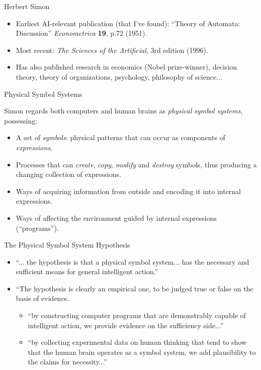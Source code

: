 \documentclass{article}
\begin{document}
\begin{slide}{}
{\Large Herbert Simon}
\begin{itemize}
\item Earliest AI-relevant publication (that I've
found): ``Theory of Automata: Discussion'' {\em Econometrica} {\bf
19}, p.72 (1951).
\item Most recent: {\em The Sciences of the Artificial}, 3rd edition
(1996).
\item Has also published research in economics (Nobel prize-winner),
decision theory, theory of organizations, psychology, philosophy of
science...
\end{itemize}
\end{slide}

\begin{slide}{}
{\Large Physical Symbol Systems}

Simon regards both computers and human brains as {\em physical symbol
systems}, possessing:
\begin{itemize}
\item A set of {\em symbols}: physical patterns that can occur as
components of {\em expressions}.
\item Processes that can {\em create}, {\em copy}, {\em modify} and
{\em destroy} symbols, thus producing a changing collection of
expressions.
\item Ways of acquiring information from outside and encoding
it into internal expressions.
\item Ways of affecting the environment guided by
internal expressions (``programs'').
\end{itemize}
\end{slide}

\begin{slide}{}
{\Large The Physical Symbol System Hypothesis}
\begin{itemize}
\item ``... the hypothesis is that a physical symbol system... has the
necessary and sufficient means for general intelligent action.''
\item ``The hypothesis is clearly an empirical one, to be judged true
or false on the basis of evidence.
\begin{itemize}
\item ``by constructing computer programs that are demonstrably
capable of intelligent action, we provide evidence on the sufficiency side...''
\item ``by collecting experimental data on human thinking that tend to
show that the human brain operates as a symbol system, we add
plausibility to the claims for necessity...''
\end{itemize}
\end{itemize}
\end{slide}
\end{document}
